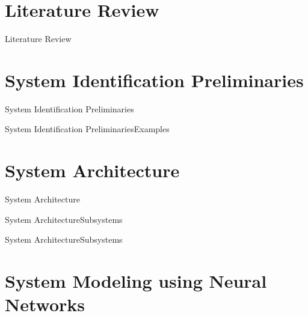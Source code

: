 \documentclass{beamer}
\begin{document}
\section{Literature Review}

\begin{frame}{Literature Review}{}

\end{frame}
\section{System Identification Preliminaries}

\begin{frame}{System Identification Preliminaries}{}

\end{frame}

\begin{frame}{System Identification Preliminaries}{Examples}
  \begin{block}{}
    \begin{LARGE}
     
    \end{LARGE}
  \end{block}
  \begin{block}{}
    \begin{LARGE}
      
    \end{LARGE}
  \end{block}
\end{frame}
\section{System Architecture}

\begin{frame}{System Architecture}{}

\end{frame}

\begin{frame}{System Architecture}{Subsystems}

\end{frame}

\begin{frame}{System Architecture}{Subsystems}

\end{frame}
\section{System Modeling using Neural Networks}
\end{document}
